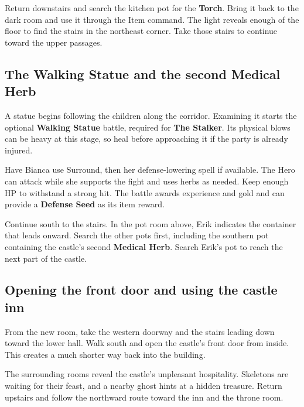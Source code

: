 Return downstairs and search the kitchen pot for the \textbf{Torch}.
Bring it back to the dark room and use it through the Item command.
The light reveals enough of the floor to find the stairs in the northeast
corner. Take those stairs to continue toward the upper passages.

\subsection*{The Walking Statue and the second Medical Herb}


A statue begins following the children along the corridor. Examining it
starts the optional \textbf{Walking Statue} battle, required for
\textbf{The Stalker}. Its physical blows
can be heavy at this stage, so heal before approaching it if the party
is already injured.

Have Bianca use Surround, then her defense-lowering spell if available.
The Hero can attack while she supports the fight and uses herbs as needed.
Keep enough HP to withstand a strong hit. The battle awards experience
and gold and can provide a \textbf{Defense Seed} as its item reward.


Continue south to the stairs. In the pot room above, Erik indicates
the container that leads onward. Search the other pots first, including
the southern pot containing the castle's second \textbf{Medical Herb}.
Search Erik's pot to reach the next part of the castle.

\subsection*{Opening the front door and using the castle inn}

From the new room, take the western doorway and the stairs leading down
toward the lower hall. Walk south and open the castle's front door from
inside. This creates a much shorter way back into the building.

The surrounding rooms reveal the castle's unpleasant hospitality.
Skeletons are waiting for their feast, and a nearby ghost hints at a
hidden treasure. Return upstairs and follow the northward route toward
the inn and the throne room.

